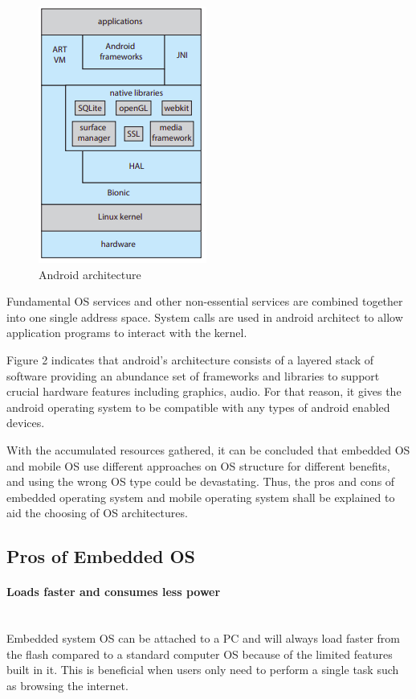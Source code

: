 \documentclass[conference]{IEEEtran}
\newcommand{\forceindent}{\leavevmode{\parindent=1em\indent}}
\begin{document}
\begin{figure}[h]
  \caption{Android architecture}
\begin{center}
\includegraphics[scale=0.5]{./images/Android_architecture.png}
\end{center}
\end{figure}

\smallskip
\forceindent Fundamental OS services and other non-essential services are combined together into one single address space\cite{Galvinbook}. System calls are used in android architect to allow application programs to interact with the kernel\cite{TDDBM}.

\smallskip
\forceindent Figure 2 indicates that android’s architecture consists of a layered stack of software providing an abundance set of frameworks and libraries to support crucial hardware features including graphics, audio\cite{Galvinbook}. For that reason, it gives the android operating system to be compatible with any types of android enabled devices.

\smallskip
\forceindent With the accumulated resources gathered, it can be concluded that embedded OS and mobile OS use different approaches on OS structure for different benefits, and using the wrong OS type could be devastating. Thus, the pros and cons of embedded operating system and mobile operating system shall be explained to aid the choosing of OS architectures.

\bigskip
\subsection{Pros of Embedded OS}
\paragraph{Loads faster and consumes less power} \mbox{} \\
\forceindent Embedded system OS can be attached to a PC and will always load faster from the flash compared to a standard computer OS because of the limited features built in it. This is beneficial when users only need to perform a single task such as browsing the internet.\cite{TDDBM}
\end{document}

